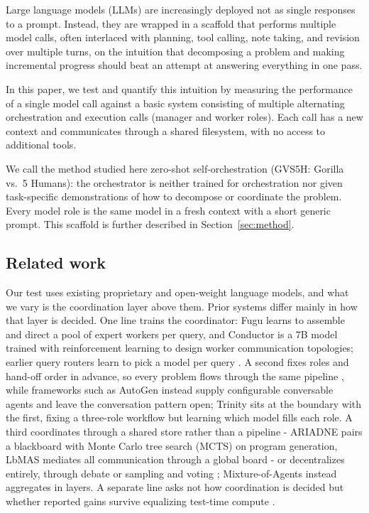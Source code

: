 \documentclass{article}
\begin{document}
Large language models (LLMs) are increasingly deployed not as single responses to a prompt. Instead, they are wrapped in a scaffold that performs multiple model calls, often interlaced with planning, tool calling, note taking,
and revision over multiple turns, on the intuition that decomposing a problem and making incremental progress should beat an attempt at answering everything in one pass.

In this paper, we test and quantify this intuition by measuring the performance of a single model call against a basic system consisting of multiple alternating orchestration and execution calls (manager and worker roles). Each call has a new context and communicates through a shared filesystem, with no access to additional tools.
 
We call the method studied here zero-shot self-orchestration (GVS5H: Gorilla vs.\ 5 Humans): the orchestrator is neither trained for orchestration nor
given task-specific demonstrations of how to decompose or coordinate the problem. Every model role is the same model in a fresh context
with a short generic prompt. This scaffold is further described in Section~\ref{sec:method}.

\subsection{Related work}
\label{sec:related}

Our test uses existing proprietary and open-weight language models, and what
we vary is the coordination layer above them. Prior systems differ mainly in how that layer is
decided. One line trains the coordinator: Fugu \citep{sakana2026} learns to assemble
and direct a pool of expert workers per query, and Conductor \citep{nielsen2025} is a 7B
model trained with reinforcement learning to design worker communication topologies; earlier query routers learn to
pick a model per query \citep{ong2024}. A second fixes roles and hand-off order in advance,
so every problem flows through the same pipeline
\citep{hong2023,qian2023,li2023,huang2023,islam2024}, while frameworks such as AutoGen
\citep{wu2023} instead supply configurable conversable agents and leave the conversation
pattern open; Trinity \citep{xu2025} sits at the boundary with the first, fixing a
three-role workflow but learning which model fills each role. A third coordinates through a
shared store rather than a pipeline - ARIADNE \citep{wei2026} pairs a blackboard with Monte
Carlo tree search (MCTS)
on program generation, LbMAS \citep{han2025} mediates all communication through a global
board - or decentralizes entirely, through debate \citep{du2023} or sampling and voting
\citep{li2024}; Mixture-of-Agents \citep{wangj2024a} instead aggregates in layers. A
separate line asks not how coordination is decided but whether reported gains survive
equalizing test-time compute \citep{wangj2024b,tran2026}.
\end{document}
